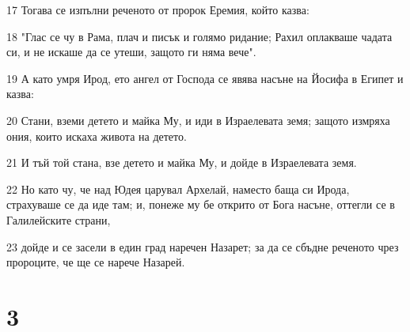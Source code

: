 \par 17 Тогава се изпълни реченото от пророк Еремия, който казва:
\par 18 "Глас се чу в Рама, плач и писък и голямо ридание; Рахил оплакваше чадата си, и не искаше да се утеши, защото ги няма вече".
\par 19 А като умря Ирод, ето ангел от Господа се явява насъне на Йосифа в Египет и казва:
\par 20 Стани, вземи детето и майка Му, и иди в Израелевата земя; защото измряха ония, които искаха живота на детето.
\par 21 И тъй той стана, взе детето и майка Му, и дойде в Израелевата земя.
\par 22 Но като чу, че над Юдея царувал Архелай, наместо баща си Ирода, страхуваше се да иде там; и, понеже му бе открито от Бога насъне, оттегли се в Галилейските страни,
\par 23 дойде и се засели в един град наречен Назарет; за да се сбъдне реченото чрез пророците, че ще се нарече Назарей.

\chapter{3}

